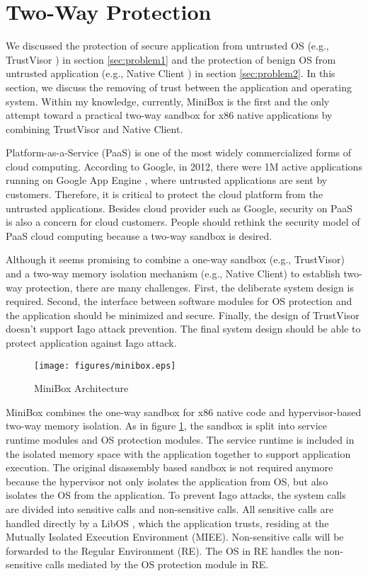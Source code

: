 \section{Two-Way Protection}
\label{sec:problem3}

We discussed the protection of secure application from untrusted OS (e.g.,
TrustVisor \cite{TrustVisor}) in section \ref{sec:problem1} and the protection
of benign OS from untrusted application (e.g., Native Client \cite{NaCl}) in
section \ref{sec:problem2}. In this section, we discuss the removing of trust
between the application and operating system. Within my knowledge, currently,
MiniBox \cite{MiniBox} is the first and the only attempt toward a practical
two-way sandbox for x86 native applications by combining TrustVisor and
Native Client.

Platform-as-a-Service (PaaS) is one of the most widely commercialized forms of
cloud computing. According to Google, in 2012, there were 1M active
applications running on Google App Engine \cite{engine}, where untrusted
applications are sent by customers. Therefore, it is critical to protect the
cloud platform from the untrusted applications. Besides cloud provider such as
Google, security on PaaS is also a concern for cloud customers. People should
rethink the security model of PaaS cloud computing because a two-way sandbox is
desired.

Although it seems promising to combine a one-way sandbox (e.g., TrustVisor) and
a two-way memory isolation mechanism (e.g., Native Client) to establish two-way
protection, there are many challenges. First, the deliberate system design is
required. Second, the interface between software modules for OS protection and
the application should be minimized and secure. Finally, the design of
TrustVisor doesn't support Iago attack prevention. The final system design
should be able to protect application against Iago attack.

\begin{figure}[htb]
\centering
\texttt{[image: figures/minibox.eps]}
\caption{MiniBox Architecture}
\label{fig:minibox}
\end{figure}

MiniBox \cite{MiniBox} combines the one-way sandbox for x86 native code and
hypervisor-based two-way memory isolation. As in figure \ref{fig:minibox}, the
sandbox is split into service runtime modules and OS protection modules. The
service runtime is included in the isolated memory space with the application
together to support application execution. The original disassembly based
sandbox is not required anymore because the hypervisor not only isolates the
application from OS, but also isolates the OS from the application. To prevent
Iago attacks, the system calls are divided into sensitive calls and
non-sensitive calls. All sensitive calls are handled directly by a LibOS
\cite{LibOS}, which the application trusts, residing at the Mutually Isolated
Execution Environment (MIEE).  Non-sensitive calls will be forwarded to the
Regular Environment (RE). The OS in RE handles the non-sensitive calls mediated
by the OS protection module in RE. 
